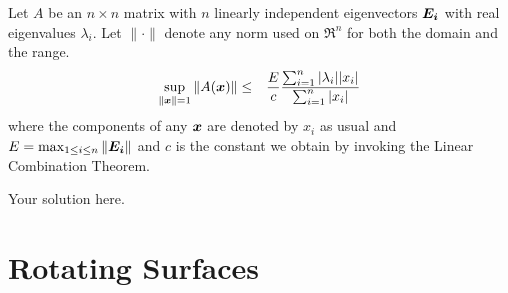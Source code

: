 \documentclass[11pt]{SelfArxOneColBMN}
\begin{document}
\begin{exercise}
Let $A$ be an $n \times n$ matrix with $n$ linearly independent eigenvectors $\boldsymbol{E_i}$ with real eigenvalues
$\lambda_i$.  Let $\| \cdot \|$ denote any norm used on $\Re^n$ for both the domain and the range.
\begin{eqnarray*}
\sup_{\|\boldsymbol{x}\| = 1} \|A(\boldsymbol{x})\| &\leq& \frac{E}{c} \frac{\sum_{i=1}^n |\lambda_i| |x_i|}{\sum_{i=1}^n |x_i|}
\end{eqnarray*}
\noindent 
where the components of any $\boldsymbol{x}$ are denoted by $x_i$ as usual and
$E = \max_{1 \leq i \leq n} \|\boldsymbol{E_i}\|$ and $c$ is the constant we obtain by invoking the Linear Combination Theorem.
\end{exercise}

\begin{solution}
Your solution here.
\end{solution}

\section{Rotating Surfaces}
\end{document}
